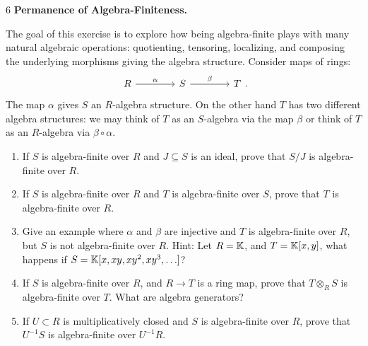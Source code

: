 \documentclass[Notebook.tex]{subfiles}
\begin{document}
\begin{problem}{6} \textbf{Permanence of Algebra-Finiteness.} 
    
    The goal of this exercise is to explore how being algebra-finite plays with many natural algebraic operations: quotienting, tensoring, localizing, and composing the underlying morphisms giving the algebra structure. Consider maps of rings:
    \[
    \begin{tikzcd}[row sep = .3em, column sep = 4em]
    R \arrow[r, "\alpha"] & S \arrow[r, "\beta"] & T
    \end{tikzcd}.
    \]
    The map $\alpha$ gives $S$ an $R$-algebra structure. On the other hand $T$ has two different algebra structures: we may think of $T$ as an $S$-algebra via the map $\beta$ or think of $T$ as an $R$-algebra via $\beta\circ\alpha$. 
    \begin{enumerate}
        \item If $S$ is algebra-finite over $R$ and $J\subseteq S$ is an ideal, prove that $S/J$ is algebra-finite over $R$.
        \item If $S$ is algebra-finite over $R$ and $T$ is algebra-finite over $S$, prove that $T$ is algebra-finite over $R$.
        \item Give an example where $\alpha$ and $\beta$ are injective and $T$ is algebra-finite over $R$, but $S$ is not algebra-finite over $R$. Hint: Let $R=\mathbb K$, and $T = \mathbb K[x,y]$, what happens if $S=\mathbb K[x,xy,xy^{2},xy^{3},\ldots]$?
        \item If $S$ is algebra-finite over $R$, and $R\to T$ is a ring map, prove that $T\otimes_R S$ is algebra-finite over $T$. What are algebra generators?
        \item If $U\subset R$ is multiplicatively closed and $S$ is algebra-finite over $R$, prove that $U^{-1}S$ is algebra-finite over $U^{-1}R$.
    \end{enumerate}
\end{problem}
\end{document}

